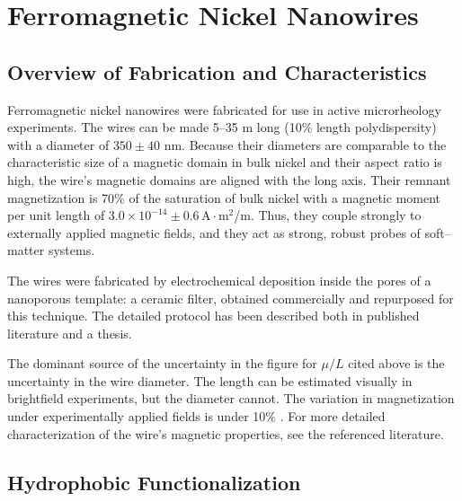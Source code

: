 \section{Ferromagnetic Nickel Nanowires}

\subsection{Overview of Fabrication and Characteristics}

Ferromagnetic nickel nanowires were fabricated for use in active microrheology experiments. The wires can be made 5--35 \textmu m long (10\% length polydispersity\cite{Hultgren2004,Hultgren2005}) with a diameter of $350 \pm 40$ nm\cite{Hultgren2004,Hultgren2005}. Because their diameters are comparable to the characteristic size of a magnetic domain in bulk nickel and their aspect ratio is high, the wire's magnetic domains are aligned with the long axis. Their remnant magnetization is 70\% of the saturation of bulk nickel\cite{Sun1999} with a magnetic moment per unit length of $3.0 \times 10^{-14}\pm0.6 \,\text{A}\cdot\text{m}^2$/\textmu m. Thus, they couple strongly to externally applied magnetic fields, and they act as strong, robust probes of soft--matter systems.

The wires were fabricated by electrochemical deposition inside the pores of a nanoporous template: a ceramic filter, obtained commercially and repurposed for this technique. The detailed protocol has been described both in published literature\cite{Chien2002} and a thesis\cite{TanaseThesis}.

The dominant source of the uncertainty in the figure for $\mu/L$ cited above is the uncertainty in the wire diameter. The length can be estimated visually in brightfield experiments, but the diameter cannot. The variation in magnetization under experimentally applied fields is under 10\% \cite{Hultgren2004,Hultgren2005}. For more detailed characterization of the wire's magnetic properties, see the referenced literature.

\subsection{Hydrophobic Functionalization}

